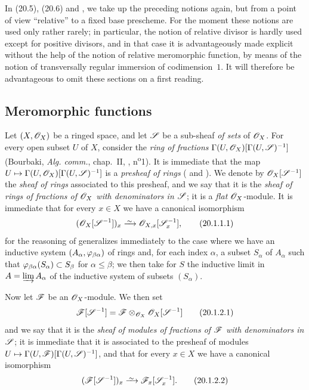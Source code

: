 In (20.5), (20.6) and , we take up the preceding notions again, but from a point of view ``relative'' to a fixed base prescheme.
For the moment these notions are used only rather rarely; in particular, the notion of relative divisor is hardly used except for positive divisors, and in that case it is advantageously made explicit without the help of the notion of relative meromorphic function, by means of the notion of transversally regular immersion of codimension~$1$.
It will therefore be advantageous to omit these sections on a first reading.

\subsection{Meromorphic functions}

\begin{env}[20.1.1]\label{IV.20.1.1}
Let $(X,\mathscr{O}_X)$ be a ringed space, and let $\mathscr{S}$ be a sub-sheaf \emph{of sets} of $\mathscr{O}_X$.
For every open subset $U$ of $X$, consider the \emph{ring of fractions} $\Gamma(U,\mathscr{O}_X)[\Gamma(U,\mathscr{S})^{-1}]$ (Bourbaki, \emph{Alg. comm.}, chap.~II, , n\textsuperscript{o}1).
It is immediate that the map $U\mapsto\Gamma(U,\mathscr{O}_X)[\Gamma(U,\mathscr{S})^{-1}]$ is a \emph{presheaf of rings} ( and ).
We denote by $\mathscr{O}_X[\mathscr{S}^{-1}]$ the \emph{sheaf of rings} associated to this presheaf, and we say that it is the \emph{sheaf of rings of fractions of $\mathscr{O}_X$ with denominators in $\mathscr{S}$}; it is a \emph{flat} $\mathscr{O}_X$-module.
It is immediate that for every $x\in X$ we have a canonical isomorphism
\[
\label{IV.20.1.1.1}
  (\sh{O}_X[\sh{S}^{-1}])_x\isoto\sh{O}_{X,x}[\sh{S}_x^{-1}],
  \tag{20.1.1.1}
\]
for the reasoning of  generalizes immediately to the case where we have an inductive system $(A_\alpha,\varphi_{\beta\alpha})$ of rings and, for each index $\alpha$, a subset $S_\alpha$ of $A_\alpha$ such that
$\varphi_{\beta\alpha}(S_\alpha)\subset S_\beta$ for $\alpha\leq\beta$; we then take for $S$ the inductive limit in $A=\varinjlim A_\alpha$ of the inductive system of subsets $(S_\alpha)$.
\end{env}

\begin{env}[20.1.2]\label{IV.20.1.2}
Now let $\mathscr{F}$ be an $\mathscr{O}_X$-module.
We then set
\[
\label{IV.20.1.2.1}
  \mathscr{F}[\mathscr{S}^{-1}]=\mathscr{F}\otimes_{\mathscr{O}_X}\mathscr{O}_X[\mathscr{S}^{-1}]
  \tag{20.1.2.1}
\]
and we say that it is the \emph{sheaf of modules of fractions of $\mathscr{F}$ with denominators in $\mathscr{S}$}; it is immediate that it is associated to the presheaf of modules $U\mapsto\Gamma(U,\mathscr{F})[\Gamma(U,\mathscr{S})^{-1}]$, and that for every $x\in X$ we have a canonical isomorphism
\[
\label{IV.20.1.2.2}
  (\sh{F}[\sh{S}^{-1}])_x\isoto\sh{F}_x[\sh{S}_x^{-1}].
  \tag{20.1.2.2}
\]
\end{env}


